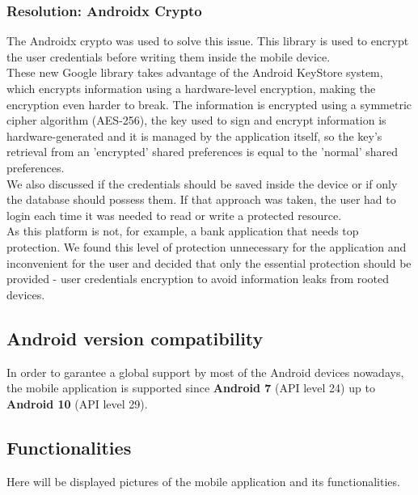 \subsubsection{Resolution: Androidx Crypto}

The Androidx crypto\cite{crypto} was used to solve this issue. This library is used to encrypt the user credentials before writing them inside the mobile device.\\

These new Google library takes advantage of the Android KeyStore\cite{keystore} system, which encrypts information using a hardware-level encryption, making the
encryption even harder to break. The information is encrypted using a symmetric cipher algorithm (AES-256), the key used to sign and encrypt information
is hardware-generated and it is managed by the application itself, so the key's retrieval from an 'encrypted' shared preferences is equal to the 'normal'
shared preferences.\\

We also discussed if the credentials should be saved inside the device or if only the database should possess them.
If that approach was taken, the user had to login each time it was needed to read or write a protected resource.\\

As this platform is not, for example, a bank application that needs top protection. We found this level of protection
unnecessary for the application and inconvenient for the user and decided that only the essential protection should be provided - 
user credentials encryption to avoid information leaks from rooted devices.

\subsection{Android version compatibility}

In order to garantee a global support by most of the Android devices nowadays, the mobile application is supported since \textbf{Android 7} (API level 24)
up to \textbf{Android 10} (API level 29).

\subsection{Functionalities}

Here will be displayed pictures of the mobile application and its functionalities.\\

